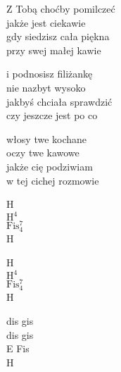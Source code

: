 \begin{text}
    Z Tobą choćby pomilczeć\\
    jakże jest ciekawie\\
    gdy siedzisz cała piękna\\
    przy swej małej kawie

    i podnosisz filiżankę\\
    nie nazbyt wysoko\\
    jakbyś chciała sprawdzić\\
    czy jeszcze jest po co

    włosy twe kochane\\
    oczy twe kawowe\\
    jakże cię podziwiam\\
    w tej cichej rozmowie
\end{text}
\begin{chord}
    H\\
    $\mathrm{H^{4}}$\\
    $\mathrm{Fis_{4}^{7}}$\\
    H

    H\\
    $\mathrm{H^{4}}$\\
    $\mathrm{Fis_{4}^{7}}$\\
    H

    dis gis\\
    dis gis\\
    E Fis\\
    H
\end{chord}
